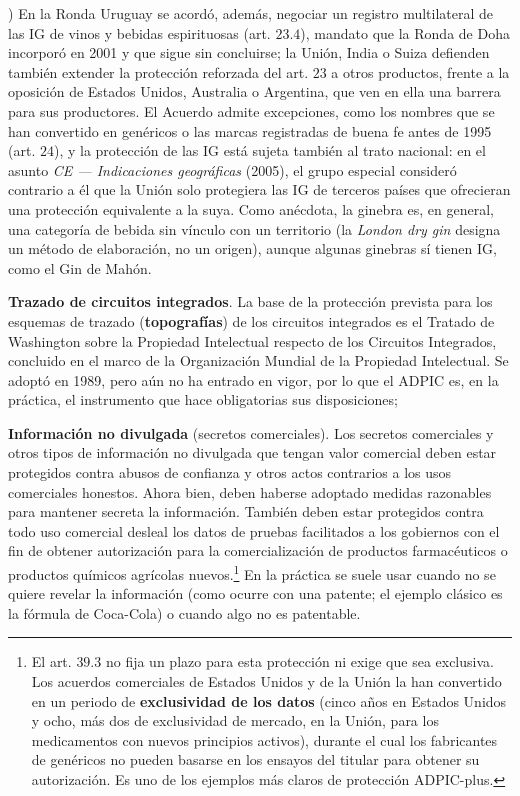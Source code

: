 \documentclass[10pt,a4paper]{article}
\newcounter{alphaitem}
\newenvironment{la}
      {\begin{list}{\alph{alphaitem})}{%
          \usecounter{alphaitem}%
          \setlength{\leftmargin}{1cm}%
          \setlength{\parskip}{3pt}%
          \setlength{\itemsep}{0pt}%
          \setlength{\parsep}{0pt}%
      }}
      {\end{list}}
\begin{document}
\begin{la}
{        En la Ronda Uruguay se acordó, además, negociar un registro multilateral de las IG de vinos y bebidas espirituosas (art. $23.4$), mandato que la Ronda de Doha incorporó en 2001 y que sigue sin concluirse; la Unión, India o Suiza defienden también extender la protección reforzada del art. $23$ a otros productos, frente a la oposición de Estados Unidos, Australia o Argentina, que ven en ella una barrera para sus productores. El Acuerdo admite excepciones, como los nombres que se han convertido en genéricos o las marcas registradas de buena fe antes de 1995 (art. $24$), y la protección de las IG está sujeta también al trato nacional: en el asunto \textit{CE --- Indicaciones geográficas} (2005), el grupo especial consideró contrario a él que la Unión solo protegiera las IG de terceros países que ofrecieran una protección equivalente a la suya. Como anécdota, la ginebra es, en general, una categoría de bebida sin vínculo con un territorio (la \textit{London dry gin} designa un método de elaboración, no un origen), aunque algunas ginebras sí tienen IG, como el Gin de Mahón.
    }
    \item \textbf{Trazado de circuitos integrados}. La base de la protección prevista para los esquemas de trazado (\textbf{topografías}) de los circuitos integrados es el Tratado de Washington sobre la Propiedad Intelectual respecto de los Circuitos Integrados, concluido en el marco de la Organización Mundial de la Propiedad Intelectual. Se adoptó en 1989, pero aún no ha entrado en vigor, por lo que el ADPIC es, en la práctica, el instrumento que hace obligatorias sus disposiciones;
    \item \textbf{Información no divulgada} (secretos comerciales). Los secretos comerciales y otros tipos de información no divulgada que tengan valor comercial deben estar protegidos contra abusos de confianza y otros actos contrarios a los usos comerciales honestos. Ahora bien, deben haberse adoptado medidas razonables para mantener secreta la información. También deben estar protegidos contra todo uso comercial desleal los datos de pruebas facilitados a los gobiernos con el fin de obtener autorización para la comercialización de productos farmacéuticos o productos químicos agrícolas nuevos.\footnote{%
        El art. $39.3$ no fija un plazo para esta protección ni exige que sea exclusiva. Los acuerdos comerciales de Estados Unidos y de la Unión la han convertido en un periodo de \textbf{exclusividad de los datos} (cinco años en Estados Unidos y ocho, más dos de exclusividad de mercado, en la Unión, para los medicamentos con nuevos principios activos), durante el cual los fabricantes de genéricos no pueden basarse en los ensayos del titular para obtener su autorización. Es uno de los ejemplos más claros de protección ADPIC-plus.
    } En la práctica se suele usar cuando no se quiere revelar la información (como ocurre con una patente; el ejemplo clásico es la fórmula de Coca-Cola) o cuando algo no es patentable.
\end{la}
\end{document}
